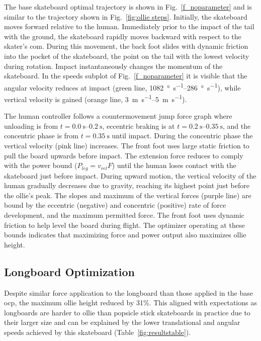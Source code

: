 \documentclass[default,iicol,pdflatex]{sn-jnl}
\begin{document}
The base skateboard optimal trajectory is shown in Fig.~\ref{f_noparameter} and is similar to the trajectory shown in Fig.~\ref{fig:ollie steps}.
Initially, the skateboard moves forward relative to the human. Immediately prior to the impact of the tail with the ground, the skateboard rapidly moves backward with respect to the skater's \gls{com}. During this movement, the back foot slides with dynamic friction into the pocket of the skateboard, the point on the tail with the lowest velocity during rotation. 
Impact instantaneously changes the momentum of the skateboard.
In the speeds subplot of Fig.~\ref{f_noparameter} it is visible that the angular velocity reduces at impact (green line, \SIrange{1082}{286}{\degree\per\second}), while vertical velocity is gained (orange line, \SIrange{3}{5}{\meter\per\second}).

The human controller follows a countermovement jump force graph where unloading is from $t=\SIrange{0.0}{0.2}{\second}$, eccentric braking is at $t=\SIrange{0.2}{0.35}{\second}$, and the concentric phase is from $t=\SI{0.35}{\second}$ until impact.
During the concentric phase the vertical velocity (pink line) increases. The front foot uses large static friction to pull the board upwards before impact.
The extension force reduces to comply with the power bound ($P_{leg} = v_{rel} F$) until the human loses contact with the skateboard just before impact.
During upward motion, the vertical velocity of the human gradually decreases due to gravity, reaching its highest point just before the ollie's peak.
The slopes and maximum of the vertical forces (purple line) are bound by the eccentric (negative) and concentric (positive) rate of force development, and the maximum permitted force. The front foot uses dynamic friction to help level the board during flight.
The optimizer operating at these bounds indicates that maximizing force and power output also maximizes ollie height.

\subsection{Longboard Optimization}
%
Despite similar force application to the longboard than those applied in the base \gls{ocp}, the maximum ollie height reduced by 31\%. This aligned with expectations as longboards are harder to ollie than popsicle stick skateboards in practice due to their larger size and can be explained by the lower translational and angular speeds achieved by this skateboard (Table~\ref{fig:resultstable}).
\end{document}
